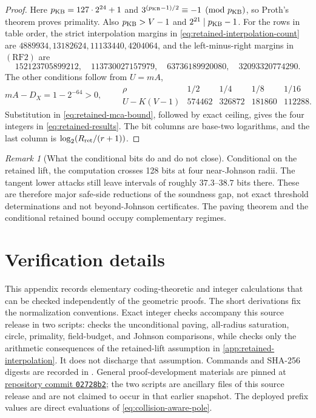 \documentclass[11pt,a4paper]{amsart}
\numberwithin{equation}{section}
\theoremstyle{remark}
\newtheorem{remark}[remark]{Remark}
\begin{document}
\begin{proof}
Here \(p_{\rm KB}=127\cdot2^{24}+1\) and
\(3^{(p_{\rm KB}-1)/2}\equiv-1\pmod {p_{\rm KB}}\), so Proth's
theorem proves primality.  Also \(p_{\rm KB}>V-1\) and
\(2^{21}\mid p_{\rm KB}-1\).
For the rows in table order, the strict interpolation margins in
\eqref{eq:retained-interpolation-count} are
\(4889934,13182624,11133440,4204064\), and the left-minus-right margins in
\((\mathrm{RF2})\) are
\[
152123705899212,\quad113730027157979,\quad
63736189920080,\quad32093320774290.
\]
The other conditions follow from \(U=mA\),
\[
 mA-D_X=1-2^{-64}>0,\qquad
 \begin{array}{c|rrrr}
 \rho&1/2&1/4&1/8&1/16\\ \hline
 U-K(V-1)&574462&326872&181860&112288.
 \end{array}
\]
Substitution in \eqref{eq:retained-mca-bound}, followed by exact ceiling,
gives the four integers in \eqref{eq:retained-results}.  The bit columns
are base-two logarithms, and the last column is
\(\log_2(R_{\rm ret}/(r+1))\).
\end{proof}

\begin{remark}[What the conditional bits do and do not close]
Conditional on the retained lift, the computation crosses 128 bits at
four near-Johnson radii.  The tangent lower attacks still leave intervals of
roughly \(37.3\)--\(38.7\) bits there.  These are therefore major
safe-side reductions of the soundness gap, not exact threshold
determinations and not beyond-Johnson certificates.  The paving theorem
and the conditional retained bound occupy complementary regimes.
\end{remark}


\section{Verification details}\label{app:verification}

This appendix records elementary coding-theoretic and integer calculations
that can be checked independently of the geometric proofs.  The short
derivations fix the normalization conventions.  Exact integer checks
accompany this source release in two scripts:
 checks the
unconditional paving, all-radius saturation, circle, primality,
field-budget, and Johnson
comparisons, while  checks only the
arithmetic consequences of the retained-lift assumption in
\cref{app:retained-interpolation}.  It does not discharge that assumption.
Commands and SHA-256 digests are recorded in
.  General proof-development materials are
pinned at
\href{https://github.com/przchojecki/rs-mca/tree/02728b208ea785d02115ea967236aebf653b31ec}
{repository commit \texttt{02728b2}}; the two scripts are ancillary files
of this source release and are not claimed to occur in that earlier snapshot.
The deployed prefix values are direct evaluations of
\eqref{eq:collision-aware-pole}.
\end{document}

